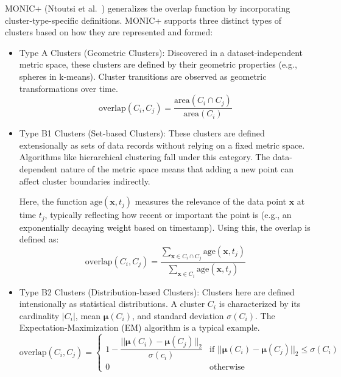 \textsc{MONIC+} (Ntoutsi et al.~\cite{monic_plus}) generalizes the overlap function by incorporating cluster-type-specific
definitions. MONIC+ supports three distinct types of clusters based on how they are represented and formed:
\begin{itemize}
    \item Type A Clusters (Geometric Clusters): Discovered in a dataset-independent
          metric space, these clusters are defined by their geometric properties (e.g.,
          spheres in k-means). Cluster transitions are observed as geometric
          transformations over time.
          \begin{equation}
              \text{overlap}(C_i,C_j) = \frac{\text{area}(C_i \cap C_j)}{\text{area}(C_i)}
          \end{equation}
    \item Type B1 Clusters (Set-based Clusters): These clusters are defined extensionally
          as sets of data records without relying on a fixed metric space. Algorithms
          like hierarchical clustering fall under this category. The data-dependent
          nature of the metric space means that adding a new point can affect cluster
          boundaries indirectly.

          Here, the function $\text{age}(\mathbf{x}, t_j)$ measures the relevance of the
          data point $\mathbf{x}$ at time $t_j$, typically reflecting how recent or
          important the point is (e.g., an exponentially decaying weight based on
          timestamp). Using this, the overlap is defined as:
          \begin{equation}
              \text{overlap}(C_i,C_j) = \frac{\sum_{\mathbf{x} \in C_i \cap C_j} \text{age}(\mathbf{x}, t_j)}{\sum_{\mathbf{x} \in C_i} \text{age}(\mathbf{x}, t_j)}
          \end{equation}
    \item Type B2 Clusters (Distribution-based Clusters): Clusters here are defined
          intensionally as statistical distributions. A cluster $C_i$ is characterized by
          its cardinality $|C_i|$, mean $\boldsymbol{\mu}(C_i)$, and standard deviation $\sigma(C_i)$.
          The Expectation-Maximization (EM) algorithm is a typical example.
          \begin{equation}
              \text{overlap}(C_i, C_j) =
              \begin{cases}
                  1 - \dfrac{||\boldsymbol{\mu}(C_i) - \boldsymbol{\mu}(C_j)||_2}{\sigma(c_i)} & \text{if } ||\boldsymbol{\mu}(C_i) - \boldsymbol{\mu}(C_j)||_2 \leq \sigma(C_i) \\
                  0                                              & \text{otherwise}
              \end{cases}
          \end{equation}
\end{itemize}

